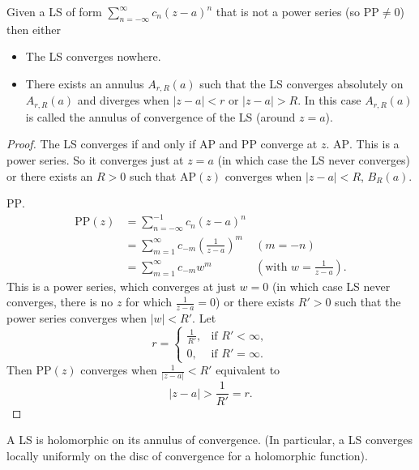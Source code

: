 \documentclass[10pt, a4paper]{article}
\begin{document}
\begin{proposition}
    Given a LS of form $\sum_{n = -\infty}^{\infty}c_n(z - a) ^ n$ that is not a power series
    (so $\mathrm{PP} \neq 0$)
    then either
    \begin{itemize}
        \item The LS converges nowhere.

        \item There exists an annulus $A_{r, R}(a)$ such that the LS converges absolutely on $A_{r, R}(a)$ and diverges when $|z - a| < r$ or $|z - a| > R$.
        In this case $A_{r, R}(a)$ is called the annulus of convergence of the LS
        (around $z = a$).
    \end{itemize}

    \begin{proof}
        The LS converges if and only if $\mathrm{AP}$ and $\mathrm{PP}$ converge at $z$.
        $\mathrm{AP}$.
        This is a power series.
        So it converges just at $z = a$
        (in which case the LS never converges)
        or there exists an $R > 0$ such that $\mathrm{AP}(z)$ converges when $|z - a| < R$,
        $B_R(a)$.

        $\mathrm{PP}$.
        \begin{align*}
            \mathrm{PP}(z) &= \sum_{n = -\infty}^{-1}c_n(z - a) ^ n \\
            &= \sum_{m = 1}^{\infty}c_{-m}\left(\frac{1}{z - a}\right) ^ m &(m = -n) \\
            &= \sum_{m = 1}^{\infty}c_{-m}w ^ m &\left(\text{with $w = \frac{1}{z - a}$}\right).
        \end{align*}
        This is a power series,
        which converges at just $w = 0$
        (in which case LS never converges,
        there is no $z$ for which $\frac{1}{z - a} = 0$)
        or there exists $R' > 0$ such that the power series converges when $|w| < R'$.
        Let
        \[
        r = \begin{cases}
            \frac{1}{R'}, &\text{if } R' < \infty, \\
            0, &\text{if } R' = \infty.
        \end{cases}
        \]
        Then $\mathrm{PP}(z)$ converges when $\frac{1}{|z - a|} < R'$ equivalent to
        \[
        |z - a| > \frac{1}{R'} = r.
        \]
    \end{proof}
\end{proposition}

\begin{corollary}
    A LS is holomorphic on its annulus of convergence.
    (In particular,
    a LS converges locally uniformly on the disc of convergence for a holomorphic function).
\end{corollary}
\end{document}
